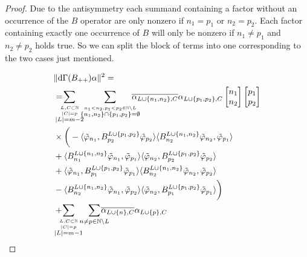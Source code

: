 \documentclass[b5paper,draft,openbib,12pt]{memoir}
\begin{document}
\begin{proof}
Due to the antisymmetry each summand containing 
a factor without an occurrence of the \(B\) operator are only 
nonzero if \(n_1=p_1\) or \(n_2=p_2\). Each factor containing 
exactly one occurrence of \(B\) will only be nonzero 
if \(n_1\neq p_1\) and \(n_2\neq p_2\) holds true. 
So we can split the block of terms into one corresponding 
to the two cases just mentioned. 

\begin{align}\nonumber
  &\|\mathrm{d}\Gamma(B_{++})\alpha\|^2 = \\\nonumber
  &= \hspace{-0.4cm}\sum_{\overset{L,C\subset \mathbb{N}}{\overset{|C|=p}{|L|=m-2}}}\hspace{-0.2cm}\sum_{\overset{n_1<n_2,p_1<p_2\in\mathbb{N}\backslash L }{\{n_1,n_2\}\cap \{p_1,p_2\}= \emptyset}}
  \hspace{-0.4cm}\overline{\alpha_{L\cup\{n_1,n_2\},C}}\alpha_{L\cup\{p_1,p_2\},C}
\left[\begin{matrix}n_1\\n_2\end{matrix}\right]
\left[\begin{matrix}p_1\\p_2\end{matrix}\right]\\\label{B++ long estimate}
    &\times \bigg(
    -\langle \tilde{\varphi}_{n_1},B^{L\cup\{p_1,p_2\}}_{p_2}\tilde{\varphi}_{p_2} \rangle \langle B^{L\cup\{n_1,n_2\}}_{n_2} \tilde{\varphi}_{n_2}, \tilde{\varphi}_{p_1}\rangle \\
    &+\langle B^{L\cup\{n_1,n_2\}}_{n_1}\tilde{\varphi}_{n_1},\tilde{\varphi}_{p_1} \rangle \langle  \tilde{\varphi}_{n_2}, B^{L\cup\{p_1,p_2\}}_{p_2}\tilde{\varphi}_{p_2}\rangle\notag\\
    &+\langle \tilde{\varphi}_{n_1},B^{L\cup\{p_1,p_2\}}_{p_1}\tilde{\varphi}_{p_1} \rangle \langle B^{L\cup\{n_1,n_2\}}_{n_2} \tilde{\varphi}_{n_2}, \tilde{\varphi}_{p_2}\rangle\notag\\
    &-\langle B^{L\cup\{n_1,n_2\}}_{n_2} \tilde{\varphi}_{n_1},\tilde{\varphi}_{p_2} \rangle \langle  \tilde{\varphi}_{n_2},B^{L\cup\{p_1,p_2\}}_{p_1} \tilde{\varphi}_{p_1}\rangle \bigg)\notag\\
  &+\hspace{-0.4cm}\sum_{\overset{L,C\subset \mathbb{N}}{\overset{|C|=p}{|L|=m-1}}}\hspace{-0.2cm}\sum_{n\neq p\in\mathbb{N}\backslash L }
  \hspace{-0.4cm}\overline{\alpha_{L\cup\{n\},C}}\alpha_{L\cup\{p\},C}

\end{align}
\end{proof}
\end{document}
